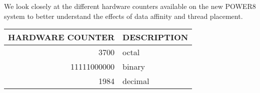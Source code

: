 We look closely at the different hardware counters available on the new POWER8 system to better understand the effects of data affinity and thread placement. \\

 \centering
\begin{tabular}{|r|l|}
  \hline
  \textbf{HARDWARE COUNTER} & {DESCRIPTION} \\
   \hline
  3700 & octal \\
   \hline
  11111000000 & binary \\
  \hline
  1984 & decimal \\
  \hline
\end{tabular}